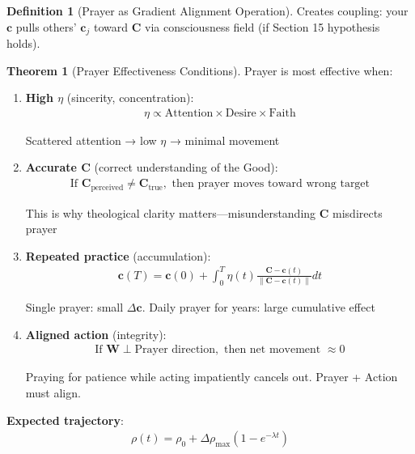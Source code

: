 \documentclass[11pt,a4paper]{article}
\theoremstyle{definition}
\newtheorem{definition}{Definition}[section]
\newtheorem{theorem}{Theorem}[section]
\theoremstyle{remark}
\newcommand{\WW}{\mathbf{W}}
\newcommand{\cc}{\mathbf{c}}
\begin{document}
\begin{small}
\begin{enumerate}
\begin{protocol}
\begin{definition}[Prayer as Gradient Alignment Operation]
Creates coupling: your \(\cc\) pulls others' \(\cc_j\) toward \(\mathbf{C}\) via consciousness field (if Section 15 hypothesis holds).
\end{definition}

\begin{theorem}[Prayer Effectiveness Conditions]
Prayer is most effective when:

\begin{enumerate}
    \item \textbf{High \(\eta\)} (sincerity, concentration):
        \begin{align}
        \eta \propto \text{Attention} \times \text{Desire} \times \text{Faith}
        \end{align}
        
        Scattered attention → low \(\eta\) → minimal movement
    
    \item \textbf{Accurate \(\mathbf{C}\)} (correct understanding of the Good):
        \begin{align}
        \text{If } \mathbf{C}_{\text{perceived}} \neq \mathbf{C}_{\text{true}}, \text{ then prayer moves toward wrong target}
        \end{align}
        
        This is why theological clarity matters—misunderstanding \(\mathbf{C}\) misdirects prayer
    
    \item \textbf{Repeated practice} (accumulation):
        \begin{align}
        \cc(T) = \cc(0) + \int_0^T \eta(t) \frac{\mathbf{C} - \cc(t)}{\|\mathbf{C} - \cc(t)\|} dt
        \end{align}
        
        Single prayer: small \(\Delta\cc\). Daily prayer for years: large cumulative effect
    
    \item \textbf{Aligned action} (integrity):
        \begin{align}
        \text{If } \WW \perp \text{Prayer direction}, \text{ then net movement } \approx 0
        \end{align}
        
        Praying for patience while acting impatiently cancels out. Prayer + Action must align.
\end{enumerate}

\textbf{Expected trajectory}:
\begin{align}
\rho(t) = \rho_0 + \Delta\rho_{\max}(1 - e^{-\lambda t})
\end{align}


\end{theorem}
\end{protocol}
\end{enumerate}
\end{small}
\end{document}
